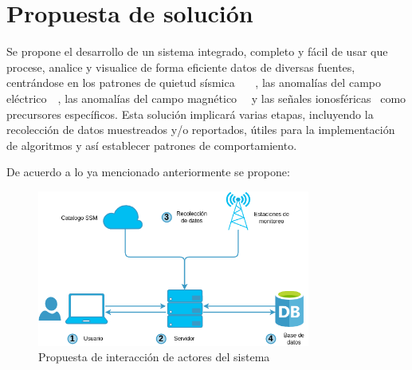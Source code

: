  \section{Propuesta de solución}
Se propone el desarrollo de un sistema integrado, completo y fácil de usar que procese, analice y visualice de forma eficiente datos de diversas fuentes, centrándose en los patrones de quietud sísmica \cite{SSN}~\cite{mcnally1983seismic}~\cite{wyss1997cannot}~\cite{scholz1997whatever}, las anomalías del campo eléctrico~\cite{varotsos1984physical}~\cite{yepez1995electric}, las anomalías del campo magnético~\cite{hayakawa1999fractal}~\cite{hayakawa2007monitoring} y las señales ionosféricas~\cite{eftaxias2003experience} como precursores específicos. Esta solución implicará varias etapas, incluyendo la recolección de datos muestreados y/o reportados, útiles para la implementación de algoritmos y así establecer patrones de comportamiento. 

 De acuerdo a lo ya mencionado anteriormente se propone:  

 \begin{figure}[H]
    \centering
    \includegraphics[width=0.8\textwidth]{img/arquitectura.drawio.png}
    \caption{Propuesta de interacción de actores del sistema}
    \label{fig:Arquitectura del sistema}
\end{figure}

